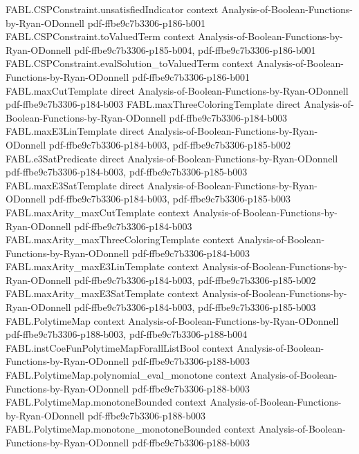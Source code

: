 \begin{theorem}
\proofstep
  {FABL.CSPConstraint.unsatisfiedIndicator}
  {context}
  {Analysis-of-Boolean-Functions-by-Ryan-ODonnell}
  {pdf-ffbe9c7b3306-p186-b001}
\proofstep
  {FABL.CSPConstraint.toValuedTerm}
  {context}
  {Analysis-of-Boolean-Functions-by-Ryan-ODonnell}
  {pdf-ffbe9c7b3306-p185-b004,
    pdf-ffbe9c7b3306-p186-b001}
\proofstep
  {FABL.CSPConstraint.evalSolution_toValuedTerm}
  {context}
  {Analysis-of-Boolean-Functions-by-Ryan-ODonnell}
  {pdf-ffbe9c7b3306-p186-b001}
\proofstep
  {FABL.maxCutTemplate}
  {direct}
  {Analysis-of-Boolean-Functions-by-Ryan-ODonnell}
  {pdf-ffbe9c7b3306-p184-b003}
\proofstep
  {FABL.maxThreeColoringTemplate}
  {direct}
  {Analysis-of-Boolean-Functions-by-Ryan-ODonnell}
  {pdf-ffbe9c7b3306-p184-b003}
\proofstep
  {FABL.maxE3LinTemplate}
  {direct}
  {Analysis-of-Boolean-Functions-by-Ryan-ODonnell}
  {pdf-ffbe9c7b3306-p184-b003,
    pdf-ffbe9c7b3306-p185-b002}
\proofstep
  {FABL.e3SatPredicate}
  {direct}
  {Analysis-of-Boolean-Functions-by-Ryan-ODonnell}
  {pdf-ffbe9c7b3306-p184-b003,
    pdf-ffbe9c7b3306-p185-b003}
\proofstep
  {FABL.maxE3SatTemplate}
  {direct}
  {Analysis-of-Boolean-Functions-by-Ryan-ODonnell}
  {pdf-ffbe9c7b3306-p184-b003,
    pdf-ffbe9c7b3306-p185-b003}
\proofstep
  {FABL.maxArity_maxCutTemplate}
  {context}
  {Analysis-of-Boolean-Functions-by-Ryan-ODonnell}
  {pdf-ffbe9c7b3306-p184-b003}
\proofstep
  {FABL.maxArity_maxThreeColoringTemplate}
  {context}
  {Analysis-of-Boolean-Functions-by-Ryan-ODonnell}
  {pdf-ffbe9c7b3306-p184-b003}
\proofstep
  {FABL.maxArity_maxE3LinTemplate}
  {context}
  {Analysis-of-Boolean-Functions-by-Ryan-ODonnell}
  {pdf-ffbe9c7b3306-p184-b003,
    pdf-ffbe9c7b3306-p185-b002}
\proofstep
  {FABL.maxArity_maxE3SatTemplate}
  {context}
  {Analysis-of-Boolean-Functions-by-Ryan-ODonnell}
  {pdf-ffbe9c7b3306-p184-b003,
    pdf-ffbe9c7b3306-p185-b003}
\proofstep
  {FABL.PolytimeMap}
  {context}
  {Analysis-of-Boolean-Functions-by-Ryan-ODonnell}
  {pdf-ffbe9c7b3306-p188-b003,
    pdf-ffbe9c7b3306-p188-b004}
\proofstep
  {FABL.instCoeFunPolytimeMapForallListBool}
  {context}
  {Analysis-of-Boolean-Functions-by-Ryan-ODonnell}
  {pdf-ffbe9c7b3306-p188-b003}
\proofstep
  {FABL.PolytimeMap.polynomial_eval_monotone}
  {context}
  {Analysis-of-Boolean-Functions-by-Ryan-ODonnell}
  {pdf-ffbe9c7b3306-p188-b003}
\proofstep
  {FABL.PolytimeMap.monotoneBounded}
  {context}
  {Analysis-of-Boolean-Functions-by-Ryan-ODonnell}
  {pdf-ffbe9c7b3306-p188-b003}
\proofstep
  {FABL.PolytimeMap.monotone_monotoneBounded}
  {context}
  {Analysis-of-Boolean-Functions-by-Ryan-ODonnell}
  {pdf-ffbe9c7b3306-p188-b003}

\end{theorem}
